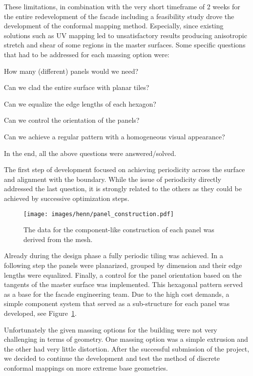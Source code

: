 \documentclass[Thesis.tex]{subfiles}
\begin{document}
These limitations, in combination with the very short timeframe of 2
weeks for the entire redevelopment of the facade including a
feasibility study drove the development of the conformal mapping
method. Especially, since existing solutions such as UV mapping led to
unsatisfactory results producing anisotropic stretch and shear of some
regions in the master surfaces.  Some specific questions that had to
be addressed for each massing option were:
\smallskip
\begin{compactitem}[$\bullet$]
\item How many (different) panels would we need?
\item Can we clad the entire surface with planar tiles?
\item Can we equalize the edge lengths of each hexagon?
\item Can we control the orientation of the panels?
\item Can we achieve a regular pattern with a homogeneous visual
  appearance?
\end{compactitem}
\smallskip
In the end, all the above questions were answered/solved.

The first step of development focused on achieving periodicity across
the surface and alignment with the boundary. While the issue of
periodicity directly addressed the last question, it is strongly
related to the others as they could be achieved by successive
optimization steps.

\begin{figure}[t]
  \centering
  \texttt{[image: images/henn/panel\_construction.pdf]}
  \caption{The data for the component-like construction of each panel was derived from the mesh.}
  \label{fig:panel_construction}
\end{figure}

Already during the design phase a fully periodic tiling was
achieved. In a following step the panels were planarized, grouped by
dimension and their edge lengths were equalized. Finally, a control
for the panel orientation based on the tangents of the \nurbs master
surface was implemented. This hexagonal pattern served as a base for
the facade engineering team. Due to the high cost demands, a simple
component system that served as a sub-structure for each panel was
developed, see Figure~\ref{fig:panel_construction}.

Unfortunately the given massing options for the building were not very
challenging in terms of geometry. One massing option was a simple
extrusion and the other had very little distortion. After the
successful submission of the project, we decided to continue the
development and test the method of discrete conformal mappings on more
extreme base geometries.
\end{document}
